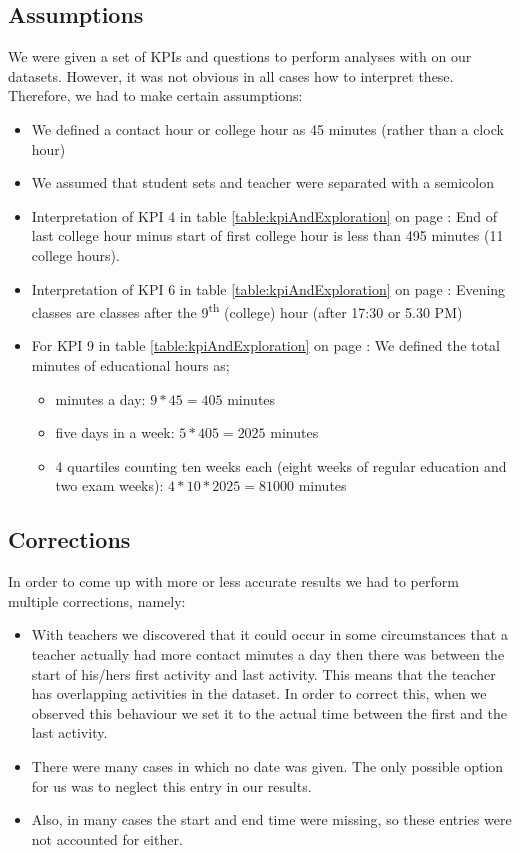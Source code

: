 \subsection{Assumptions}
We were given a set of KPIs and questions to perform analyses with on our datasets. However, it was not obvious in all cases how to interpret these. Therefore, we had to make certain assumptions:
\begin{itemize}
	\item We defined a contact hour or college hour as 45 minutes (rather than a clock hour)
	\item We assumed that student sets and teacher were separated with a semicolon
	\item Interpretation of KPI 4 in table \ref{table:kpiAndExploration} on page \pageref{table:kpiAndExploration}: End of last college hour minus start of first college hour is less than 495 minutes (11 college hours).
	\item Interpretation of KPI 6 in table \ref{table:kpiAndExploration} on page \pageref{table:kpiAndExploration}: Evening classes are classes after the 9\textsuperscript{th} (college) hour (after 17:30 or 5.30 PM)
	\item For KPI 9 in table \ref{table:kpiAndExploration} on page \pageref{table:kpiAndExploration}: We defined the total minutes of educational hours as;
	\begin{itemize} 
	\item minutes a day: $9*45=405$ minutes
	\item five days in a week: $5*405=2025$ minutes
	\item 4 quartiles counting ten weeks each (eight weeks of regular education and two exam weeks): $4*10*2025=81000$ minutes
	\end{itemize}
\end{itemize}

\subsection{Corrections}
In order to come up with more or less accurate results we had to perform multiple corrections, namely:
\begin{itemize}
	\item With teachers we discovered that it could occur in some circumstances that a teacher actually had more contact minutes a day then there was between the start of his/hers first activity and last activity. This means that the teacher has overlapping activities in the dataset. In order to correct this, when we observed this behaviour we set it to the actual time between the first and the last activity.
	\item There were many cases in which no date was given. The only possible option for us was to neglect this entry in our results.
	\item Also, in many cases the start and end time were missing, so these entries were not accounted for either.
\end{itemize}


